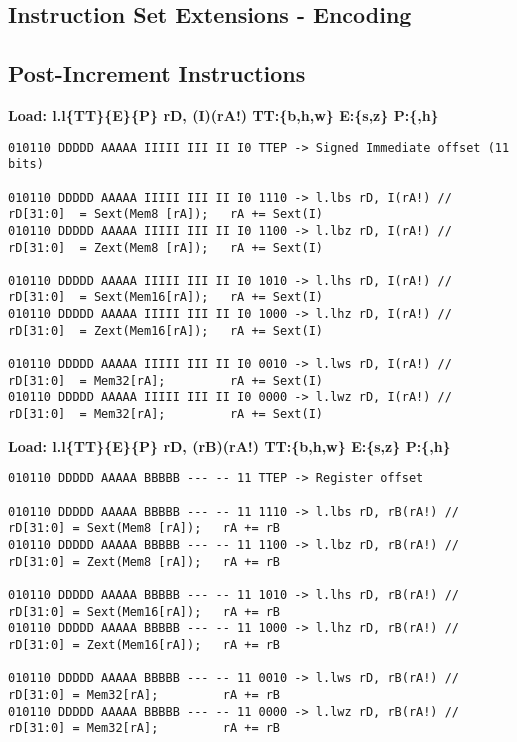 \begin{landscape}
\chapter{Instruction Set Extensions - Encoding}
\label{chap:instr_encoding}

\section{Post-Increment Instructions}

\textbf{Load: l.l\{TT\}\{E\}\{P\} rD, (I)(rA!) TT:\{b,h,w\} E:\{s,z\} P:\{,h\}}

\begin{verbatim}
010110 DDDDD AAAAA IIIII III II I0 TTEP -> Signed Immediate offset (11 bits)

010110 DDDDD AAAAA IIIII III II I0 1110 -> l.lbs rD, I(rA!) // rD[31:0]  = Sext(Mem8 [rA]);   rA += Sext(I)
010110 DDDDD AAAAA IIIII III II I0 1100 -> l.lbz rD, I(rA!) // rD[31:0]  = Zext(Mem8 [rA]);   rA += Sext(I)

010110 DDDDD AAAAA IIIII III II I0 1010 -> l.lhs rD, I(rA!) // rD[31:0]  = Sext(Mem16[rA]);   rA += Sext(I)
010110 DDDDD AAAAA IIIII III II I0 1000 -> l.lhz rD, I(rA!) // rD[31:0]  = Zext(Mem16[rA]);   rA += Sext(I)

010110 DDDDD AAAAA IIIII III II I0 0010 -> l.lws rD, I(rA!) // rD[31:0]  = Mem32[rA];         rA += Sext(I)
010110 DDDDD AAAAA IIIII III II I0 0000 -> l.lwz rD, I(rA!) // rD[31:0]  = Mem32[rA];         rA += Sext(I)
\end{verbatim}

\clearpage


\textbf{Load: l.l\{TT\}\{E\}\{P\} rD, (rB)(rA!)  TT:\{b,h,w\} E:\{s,z\} P:\{,h\}}

\begin{verbatim}
010110 DDDDD AAAAA BBBBB --- -- 11 TTEP -> Register offset

010110 DDDDD AAAAA BBBBB --- -- 11 1110 -> l.lbs rD, rB(rA!) // rD[31:0] = Sext(Mem8 [rA]);   rA += rB
010110 DDDDD AAAAA BBBBB --- -- 11 1100 -> l.lbz rD, rB(rA!) // rD[31:0] = Zext(Mem8 [rA]);   rA += rB

010110 DDDDD AAAAA BBBBB --- -- 11 1010 -> l.lhs rD, rB(rA!) // rD[31:0] = Sext(Mem16[rA]);   rA += rB
010110 DDDDD AAAAA BBBBB --- -- 11 1000 -> l.lhz rD, rB(rA!) // rD[31:0] = Zext(Mem16[rA]);   rA += rB

010110 DDDDD AAAAA BBBBB --- -- 11 0010 -> l.lws rD, rB(rA!) // rD[31:0] = Mem32[rA];         rA += rB
010110 DDDDD AAAAA BBBBB --- -- 11 0000 -> l.lwz rD, rB(rA!) // rD[31:0] = Mem32[rA];         rA += rB
\end{verbatim}


\end{landscape}
